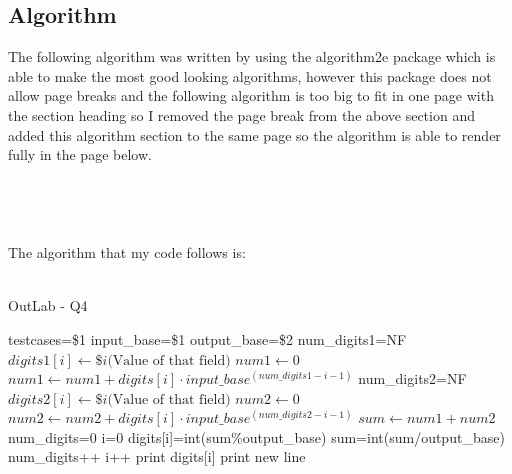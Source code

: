 \documentclass[12pt]{article}
\begin{document}
\subsection{Algorithm}
The following algorithm was written by using the algorithm2e package which is able 
to make the most good looking algorithms, however this package does not allow page
breaks and the following algorithm is too big to fit in one page with the section
heading so I removed the page break from the above section and added this algorithm 
section to the same page so the algorithm is able to render fully in the page below.\\
\\\\\\\\
The algorithm that my code follows is:\\\\
\begin{algorithm*}
    \label{Q4}
    \caption{OutLab - Q4}\label{alg:Q4}
    {
        {
            testcases=\$1\;
        }
        {
            input\_base=\$1\;
			output\_base=\$2\;
        }
        {
            num\_digits1=NF\;
            {
                $digits1[i] \gets \$i\textrm{(Value of that field)}$\;
            }
            $num1 \gets 0$\;
            {
                $num1 \gets num1 + digits[i]\cdot input\_base^{(num\_digits1-i-1)}$\;
            }
        }
        {
            num\_digits2=NF\;
            {
                $digits2[i] \gets \$i\textrm{(Value of that field)}$\;
            }
            $num2 \gets 0$\;
            {
                $num2 \gets num2 + digits[i]\cdot input\_base^{(num\_digits2-i-1)}$\;
            }
            $sum \gets num1 + num2$\;
            num\_digits=0\;
            i=0\;
			{	
				digits[i]=int(sum\%output\_base)\;
				sum=int(sum/output\_base)\;
				num\_digits++\;
				i++\;
			}
            {
                print digits[i]
            }
            print new line
        }

    } 
\end{algorithm*}
\newpage
\end{document}
